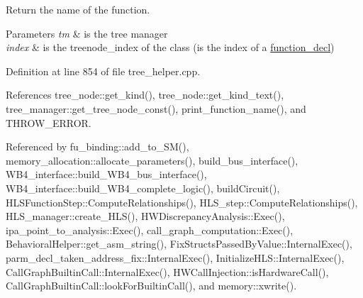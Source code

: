Return the name of the function. 


\begin{DoxyParams}{Parameters}
{\em tm} & is the tree manager \\
\hline
{\em index} & is the treenode\+\_\+index of the class (is the index of a \hyperlink{structfunction__decl}{function\+\_\+decl}) \\
\hline
\end{DoxyParams}


Definition at line 854 of file tree\+\_\+helper.\+cpp.



References tree\+\_\+node\+::get\+\_\+kind(), tree\+\_\+node\+::get\+\_\+kind\+\_\+text(), tree\+\_\+manager\+::get\+\_\+tree\+\_\+node\+\_\+const(), print\+\_\+function\+\_\+name(), and T\+H\+R\+O\+W\+\_\+\+E\+R\+R\+OR.



Referenced by fu\+\_\+binding\+::add\+\_\+to\+\_\+\+S\+M(), memory\+\_\+allocation\+::allocate\+\_\+parameters(), build\+\_\+bus\+\_\+interface(), W\+B4\+\_\+interface\+::build\+\_\+\+W\+B4\+\_\+bus\+\_\+interface(), W\+B4\+\_\+interface\+::build\+\_\+\+W\+B4\+\_\+complete\+\_\+logic(), build\+Circuit(), H\+L\+S\+Function\+Step\+::\+Compute\+Relationships(), H\+L\+S\+\_\+step\+::\+Compute\+Relationships(), H\+L\+S\+\_\+manager\+::create\+\_\+\+H\+L\+S(), H\+W\+Discrepancy\+Analysis\+::\+Exec(), ipa\+\_\+point\+\_\+to\+\_\+analysis\+::\+Exec(), call\+\_\+graph\+\_\+computation\+::\+Exec(), Behavioral\+Helper\+::get\+\_\+asm\+\_\+string(), Fix\+Structs\+Passed\+By\+Value\+::\+Internal\+Exec(), parm\+\_\+decl\+\_\+taken\+\_\+address\+\_\+fix\+::\+Internal\+Exec(), Initialize\+H\+L\+S\+::\+Internal\+Exec(), Call\+Graph\+Builtin\+Call\+::\+Internal\+Exec(), H\+W\+Call\+Injection\+::is\+Hardware\+Call(), Call\+Graph\+Builtin\+Call\+::look\+For\+Builtin\+Call(), and memory\+::xwrite().

